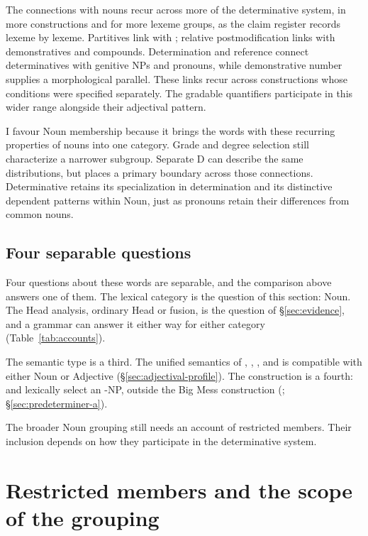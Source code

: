 \documentclass[12pt]{article}
\begin{document}
The connections with nouns recur across more of the determinative system, in more constructions and for more lexeme groups, as the claim register records lexeme by lexeme. Partitives link  with ; relative postmodification links  with demonstratives and compounds. Determination and reference connect determinatives with genitive NPs and pronouns, while demonstrative number supplies a morphological parallel. These links recur across constructions whose conditions were specified separately. The gradable quantifiers participate in this wider range alongside their adjectival pattern.

I favour Noun membership because it brings the words with these recurring properties of nouns into one category. Grade and degree selection still characterize a narrower subgroup. Separate D can describe the same distributions, but places a primary boundary across those connections. Determinative retains its specialization in determination and its distinctive dependent patterns within Noun, just as pronouns retain their differences from common nouns.

\subsection{Four separable questions}\label{sec:four-questions}

Four questions about these words are separable, and the comparison above answers one of them. The lexical category is the question of this section: Noun. The Head analysis, ordinary Head or fusion, is the question of §\ref{sec:evidence}, and a grammar can answer it either way for either category (Table~\ref{tab:accounts}).

The semantic type is a third. The unified semantics of , , , and  is compatible with either Noun or Adjective (§\ref{sec:adjectival-profile}). The construction is a fourth:  and  lexically select an -NP, outside the Big Mess construction (; §\ref{sec:predeterminer-a}).

The broader Noun grouping still needs an account of restricted members. Their inclusion depends on how they participate in the determinative system.

\section{Restricted members and the scope of the grouping}\label{sec:articles}
\end{document}
